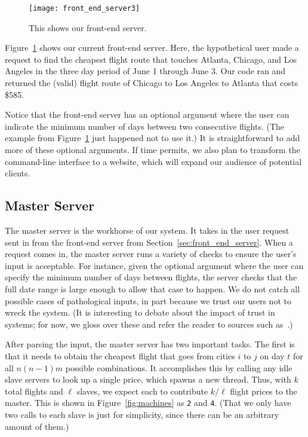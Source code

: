 \documentclass{article}
\begin{document}
\begin{figure}[t]
\vskip 0.2in
\begin{center}
\centerline{\texttt{[image: front\_end\_server3]}}
\caption{This shows our front-end server.}
\label{fig:front_end_server}
\end{center}
\vskip -0.2in
\end{figure}

Figure~\ref{fig:front_end_server} shows our current front-end server. Here, the hypothetical user made a request to find the cheapest flight route
that touches Atlanta, Chicago, and Los Angeles in the three day period of June 1 through June 3.  Our code ran and returned the (valid) flight route
of Chicago to Los Angeles to Atlanta that costs \$585.

Notice that the front-end server has an optional argument where the user can indicate the minimum number of days between two consecutive flights. (The
example from Figure~\ref{fig:front_end_server} just happened not to use it.) It is straightforward to add more of these optional arguments. If time
permits, we also plan to transform the command-line interface to a website, which will expand our audience of potential clients.


\subsection{Master Server}\label{sec:master_server}

The master server is the workhorse of our system. It takes in the user request sent in from the front-end server from
Section~\ref{sec:front_end_server}. When a request comes in, the master server runs a variety of checks to ensure the user's input is acceptable.  For
instance, given the optional argument where the user can specify the minimum number of days between flights, the server checks that the full date
range is large enough to allow that case to happen. We do not catch all possible cases of pathological inputs, in part because we trust our users not
to wreck the system. (It is interesting to debate about the impact of trust in systems; for now, we gloss over these and refer the reader to sources
such as~\cite{Blaze:2001:RTM:380171.380186}.)

After parsing the input, the master server has two important tasks. The first is that it needs to obtain the cheapest flight that goes from cities $i$
to $j$ on day $t$ for all $n(n-1)m$ possible combinations. It accomplishes this by calling any idle slave servers to look up a single price, which
spawns a new thread. Thus, with $k$ total flights and $\ell$ slaves, we expect each to contribute $k/\ell$ flight prices to the master. This is shown
in Figure~\ref{fig:machines} as \texttt{2} and \texttt{4}. (That we only have two calls to each slave is just for simplicity, since there can be an
arbitrary amount of them.)
\end{document}
